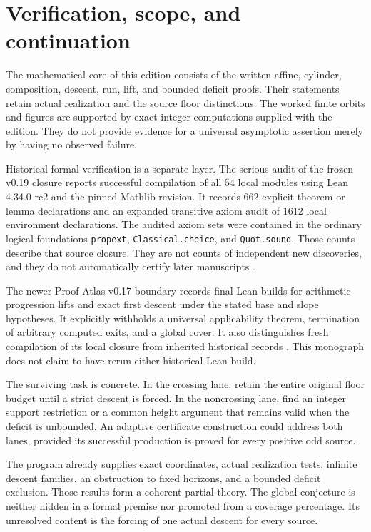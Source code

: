 \section{Verification, scope, and continuation}
The mathematical core of this edition consists of the written affine, cylinder, composition, descent, run, lift, and bounded deficit proofs. Their statements retain actual realization and the source floor distinctions. The worked finite orbits and figures are supported by exact integer computations supplied with the edition. They do not provide evidence for a universal asymptotic assertion merely by having no observed failure.

Historical formal verification is a separate layer. The serious audit of the frozen v0.19 closure reports successful compilation of all 54 local modules using Lean 4.34.0 rc2 and the pinned Mathlib revision. It records 662 explicit theorem or lemma declarations and an expanded transitive axiom audit of 1612 local environment declarations. The audited axiom sets were contained in the ordinary logical foundations \texttt{propext}, \texttt{Classical.choice}, and \texttt{Quot.sound}. Those counts describe that source closure. They are not counts of independent new discoveries, and they do not automatically certify later manuscripts \cite{projectcollatzaudit}.

The newer Proof Atlas v0.17 boundary records final Lean builds for arithmetic progression lifts and exact first descent under the stated base and slope hypotheses. It explicitly withholds a universal applicability theorem, termination of arbitrary computed exits, and a global cover. It also distinguishes fresh compilation of its local closure from inherited historical records \cite{projectcollatzboundary}. This monograph does not claim to have rerun either historical Lean build.

The surviving task is concrete. In the crossing lane, retain the entire original floor budget until a strict descent is forced. In the noncrossing lane, find an integer support restriction or a common height argument that remains valid when the deficit is unbounded. An adaptive certificate construction could address both lanes, provided its successful production is proved for every positive odd source.

The program already supplies exact coordinates, actual realization tests, infinite descent families, an obstruction to fixed horizons, and a bounded deficit exclusion. Those results form a coherent partial theory. The global conjecture is neither hidden in a formal premise nor promoted from a coverage percentage. Its unresolved content is the forcing of one actual descent for every source.
